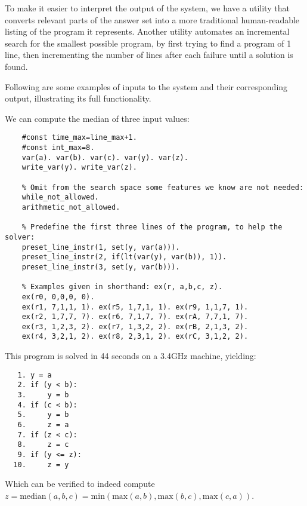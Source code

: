 \documentclass[a4paper,twoside,notitlepage]{article}
\begin{document}
To make it easier to interpret the output of the system, we have a utility 
that converts relevant parts of the answer set into a more traditional 
human-readable listing of the program it represents. Another utility 
automates an incremental search for the smallest possible program, by 
first trying to find a program of 1 line, then incrementing the number of 
lines after each failure until a solution is found.

Following are some examples of inputs to the system and their 
corresponding output, illustrating its full functionality.

We can compute the median of three input values:
\begin{verbatim}
    #const time_max=line_max+1.
    #const int_max=8.
    var(a). var(b). var(c). var(y). var(z).
    write_var(y). write_var(z).
    
    % Omit from the search space some features we know are not needed:
    while_not_allowed.
    arithmetic_not_allowed.
    
    % Predefine the first three lines of the program, to help the solver:
    preset_line_instr(1, set(y, var(a))).
    preset_line_instr(2, if(lt(var(y), var(b)), 1)).
    preset_line_instr(3, set(y, var(b))).
    
    % Examples given in shorthand: ex(r, a,b,c, z).
    ex(r0, 0,0,0, 0).
    ex(r1, 7,1,1, 1). ex(r5, 1,7,1, 1). ex(r9, 1,1,7, 1).
    ex(r2, 1,7,7, 7). ex(r6, 7,1,7, 7). ex(rA, 7,7,1, 7).
    ex(r3, 1,2,3, 2). ex(r7, 1,3,2, 2). ex(rB, 2,1,3, 2).
    ex(r4, 3,2,1, 2). ex(r8, 2,3,1, 2). ex(rC, 3,1,2, 2).
\end{verbatim}
This program is solved in 44 seconds on a 3.4GHz machine, yielding:
\begin{verbatim}
   1. y = a
   2. if (y < b):
   3.     y = b
   4. if (c < b):
   5.     y = b
   6.     z = a
   7. if (z < c):
   8.     z = c
   9. if (y <= z):
  10.     z = y
\end{verbatim}
Which can be verified to indeed compute $z = \textrm{median}(a,b,c) = 
\textrm{min}(\textrm{max}(a,b), \textrm{max}(b,c), \textrm{max}(c,a))$.
\end{document}
